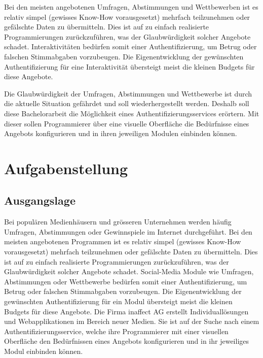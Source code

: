 Bei den meisten angebotenen Umfragen, Abstimmungen und Wettbewerben ist
es relativ simpel (gewisses Know-How vorausgesetzt) mehrfach
teilzunehmen oder gefälschte Daten zu übermitteln. Dies ist auf zu
einfach realisierte Programmierungen zurückzuführen, was der
Glaubwürdigkeit solcher Angebote schadet. Interaktivitäten bedürfen
somit einer Authentifizierung, um Betrug oder falschen Stimmabgaben
vorzubeugen. Die Eigenentwicklung der gewünschten Authentifizierung für
eine Interaktivität übersteigt meist die kleinen Budgets für diese
Angebote.

Die Glaubwürdigkeit der Umfragen, Abstimmungen und Wettbewerbe ist durch
die aktuelle Situation gefährdet und soll wiederhergestellt werden.
Deshalb soll diese Bachelorarbeit die Möglichkeit eines
Authentifizierungsservices erörtern. Mit dieser sollen Programmierer
über eine visuelle Oberfläche die Bedürfnisse eines Angebots
konfigurieren und in ihren jeweiligen Modulen einbinden können.

\newpage

\section{Aufgabenstellung}\label{aufgabenstellung}

\subsection{Ausgangslage}\label{ausgangslage}

Bei populären Medienhäusern und grösseren Unternehmen werden häufig
Umfragen, Abstimmungen oder Gewinnspiele im Internet durchgeführt. Bei
den meisten angebotenen Programmen ist es relativ simpel (gewisses
Know-How vorausgesetzt) mehrfach teilzunehmen oder gefälschte Daten zu
übermitteln. Dies ist auf zu einfach realisierte Programmierungen
zurückzuführen, was der Glaubwürdigkeit solcher Angebote schadet.
Social-Media Module wie Umfragen, Abstimmungen oder Wettbewerbe bedürfen
somit einer Authentifizierung, um Betrug oder falschen Stimmabgaben
vorzubeugen. Die Eigenentwicklung der gewünschten Authentifizierung für
ein Modul übersteigt meist die kleinen Budgets für diese Angebote. Die
Firma inaffect AG erstellt Individuallösungen und Webapplikationen im
Bereich neuer Medien. Sie ist auf der Suche nach einem
Authentifizierungsservice, welche ihre Programmierer mit einer visuellen
Oberfläche den Bedürfnissen eines Angebots konfigurieren und in ihr
jeweiliges Modul einbinden können.

